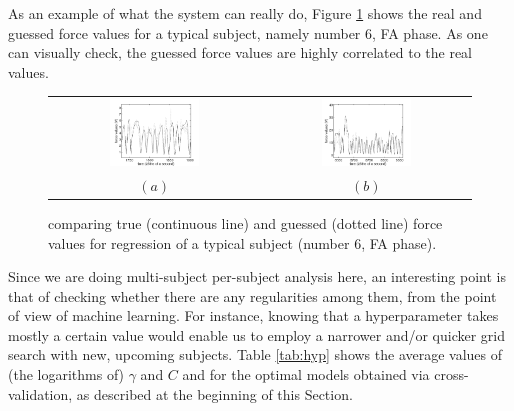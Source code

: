 As an example of what the system can really do, Figure
\ref{fig:examples} shows the real and guessed force values for a
typical subject, namely number $6$, FA phase. As one can visually
check, the guessed force values are highly correlated to the real
values.

\begin{figure}[!ht] \centering
  \begin{tabular}{cc}
    \includegraphics[width=0.45\textwidth]{figs/example_6_one} &
    \includegraphics[width=0.45\textwidth]{figs/example_6_two} \\
    $(a)$ & $(b)$ \\
  \end{tabular}
  \caption{comparing true (continuous line) and guessed (dotted line) force values for regression of a
    typical subject (number $6$, FA phase).}
  \label{fig:examples}
\end{figure}

Since we are doing multi-subject per-subject analysis here, an
interesting point is that of checking whether there are any
regularities among them, from the point of view of machine
learning. For instance, knowing that a hyperparameter takes mostly a
certain value would enable us to employ a narrower and/or quicker grid
search with new, upcoming subjects. Table \ref{tab:hyp} shows the
average values of (the logarithms of) $\gamma$ and $C$ and for the
optimal models obtained via cross-validation, as described at the
beginning of this Section.

